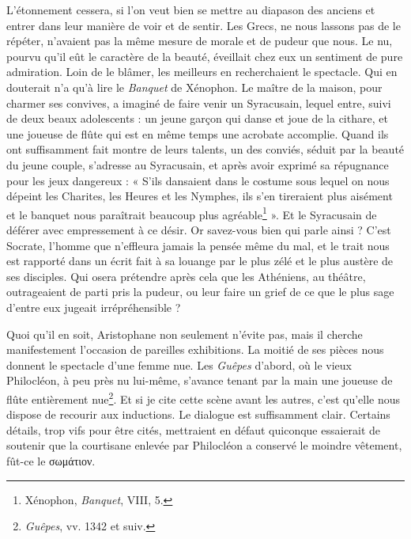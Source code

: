 \documentclass{book}%
\newcommand{\italique}[1]{\textit{#1}}%
\newcommand{\note}[1]{\footnote{#1}}
\begin{document}
L'étonnement cessera, si l'on veut bien se mettre au diapason des anciens et entrer dans leur manière de voir et de sentir. Les Grecs, ne nous lassons pas de le répéter, n'avaient pas la même mesure de morale et de pudeur que nous. Le nu, pourvu qu'il eût le caractère de la beauté, éveillait chez eux un sentiment de pure admiration. Loin de le blâmer, les meilleurs en recherchaient le spectacle. Qui en douterait n'a qu'à lire le \italique{Banquet} de Xénophon. Le maître de la maison, pour charmer ses convives, a imaginé de faire venir un Syracusain, lequel entre, suivi de deux beaux adolescents : un jeune garçon qui danse et joue de la cithare, et une joueuse de flûte qui est en même temps une acrobate accomplie. 
Quand ils ont suffisamment fait montre de leurs talents, un des conviés, séduit par la beauté du jeune couple, s'adresse au Syracusain, et après avoir exprimé sa répugnance pour les jeux dangereux : « S'ils dansaient dans le costume sous lequel on nous dépeint les Charites, les Heures et les Nymphes, ils s'en tireraient plus aisément et le banquet nous paraîtrait beaucoup plus agréable\note{Xénophon, \italique{Banquet}, VIII, 5.} ». 
Et le Syracusain de déférer avec empressement à ce désir. Or savez-vous bien qui parle ainsi ? C'est Socrate, l'homme que n'effleura jamais la pensée même du mal, et le trait nous est rapporté dans un écrit fait à sa louange par le plus zélé et le plus austère de ses disciples. Qui osera prétendre après cela que les Athéniens, au théâtre, outrageaient de parti pris la pudeur, ou leur faire un grief de ce que le plus sage d'entre eux jugeait irrépréhensible ? 

Quoi qu'il en soit, Aristophane non seulement n'évite pas, mais il cherche manifestement l'occasion de pareilles exhibitions. 
La moitié de ses pièces nous donnent le spectacle d'une femme nue. Les \italique{Guêpes} d'abord, où le vieux Philocléon, à peu près nu lui-même, s'avance tenant par la main une joueuse de flûte entièrement nue\note{\italique{Guêpes}, vv. 1342 et suiv.}. Et si je cite cette scène avant les autres, c'est qu'elle nous dispose de recourir aux inductions. Le dialogue est suffisamment clair. Certains détails, trop vifs pour être cités, mettraient en défaut quiconque essaierait de soutenir que la courtisane enlevée par Philocléon a conservé le moindre vêtement, fût-ce le σωμάτιον.
\end{document}
